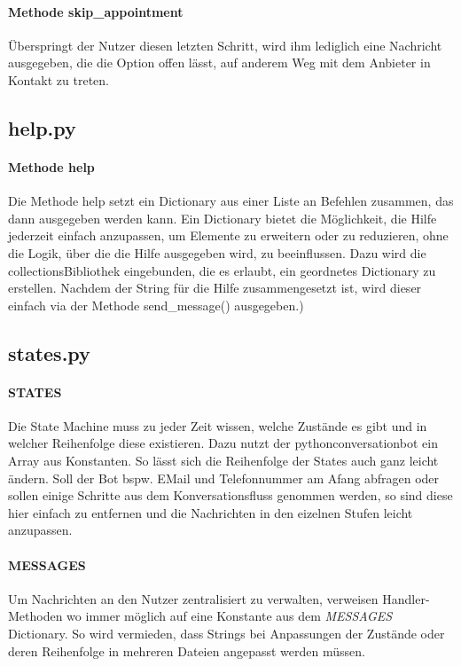             \paragraph{Methode skip\_appointment}
                Überspringt der Nutzer diesen letzten Schritt, wird ihm lediglich eine Nachricht ausgegeben, die die Option offen lässt, auf anderem Weg mit dem Anbieter in Kontakt zu treten.

        
        \subsection{help.py}
            \paragraph{Methode help}
                Die Methode help setzt ein Dictionary aus einer Liste an Befehlen zusammen, das dann ausgegeben werden kann. Ein Dictionary bietet die Möglichkeit, die Hilfe jederzeit einfach anzupassen, um Elemente zu erweitern oder zu reduzieren, ohne die Logik, über die die Hilfe ausgegeben wird, zu beeinflussen. Dazu wird die collections\-Bibliothek eingebunden, die es erlaubt, ein geordnetes Dictionary zu erstellen. Nachdem der String für die Hilfe zusammengesetzt ist, wird dieser einfach via der Methode send\_message() ausgegeben.)


        \subsection{states.py}
            \paragraph{STATES}
                Die State Machine muss zu jeder Zeit wissen, welche Zustände es gibt und in welcher Reihenfolge diese existieren. Dazu nutzt der python\-conversation\-bot \cite{conversationBot} ein Array aus Konstanten. So lässt sich die Reihenfolge der States auch ganz leicht ändern. Soll der Bot bspw. E\-Mail und Telefonnummer am Afang abfragen oder sollen einige Schritte aus dem Konversationsfluss genommen werden, so sind diese hier einfach zu entfernen und die Nachrichten in den eizelnen Stufen leicht anzupassen.

            \paragraph{MESSAGES}
                Um Nachrichten an den Nutzer zentralisiert zu verwalten, verweisen Handler-Methoden wo immer möglich auf eine Konstante aus dem \emph{MESSAGES} Dictionary. So wird vermieden, dass Strings bei Anpassungen der Zustände oder deren Reihenfolge in mehreren Dateien angepasst werden müssen.
            

